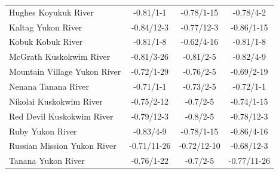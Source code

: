 \documentclass[12pts,draft]{AR_analysis_}
\begin{document}
\begin{table}[h]
\begin{tabular}{lccc}
	Hughes Koyukuk River          &    -0.81/1-1 &   -0.78/1-15 &    -0.78/4-2 \\
	Kaltag Yukon River            &   -0.84/12-3 &   -0.77/12-3 &   -0.86/1-15 \\
	Kobuk Kobuk River             &    -0.81/1-8 &   -0.62/4-16 &    -0.81/1-8 \\
	McGrath Kuskokwim River       &   -0.81/3-26 &    -0.81/2-5 &    -0.82/4-9 \\
	Mountain Village Yukon River  &   -0.72/1-29 &    -0.76/2-5 &   -0.69/2-19 \\
	Nenana Tanana River           &    -0.71/1-1 &    -0.73/2-5 &    -0.72/1-1 \\
	Nikolai Kuskokwim River       &   -0.75/2-12 &     -0.7/2-5 &   -0.74/1-15 \\
	Red Devil Kuskokwim River     &   -0.79/12-3 &     -0.8/2-5 &   -0.78/12-3 \\
	Ruby Yukon River              &    -0.83/4-9 &   -0.78/1-15 &   -0.86/4-16 \\
	Russian Mission Yukon River   &  -0.71/11-26 &  -0.72/12-10 &   -0.68/12-3 \\
	Tanana Yukon River            &   -0.76/1-22 &     -0.7/2-5 &  -0.77/11-26 \\
    \bottomrule
    \end{tabular}
\end{table}
\end{document}
